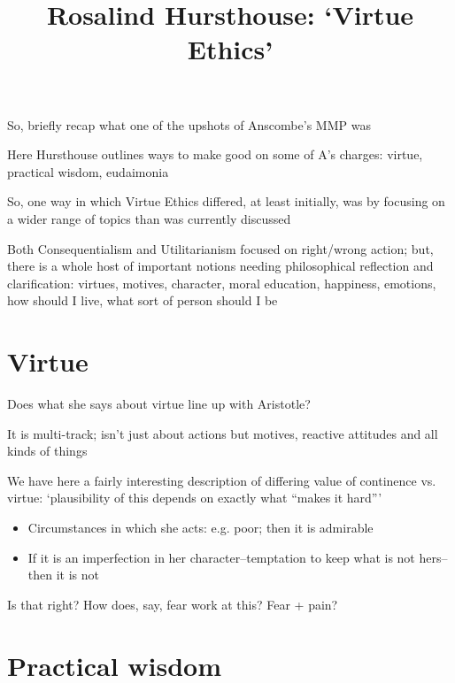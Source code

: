 \documentclass[11pt]{article}
\title{Rosalind Hursthouse: `Virtue Ethics'}
\author{}
\date{}
\begin{document}
\maketitle

\noindent So, briefly recap what one of the upshots of Anscombe's MMP was
\vspace*{2mm}

\noindent Here Hursthouse outlines ways to make good on some of A's charges: virtue, practical wisdom, eudaimonia
\vspace*{2mm}

\noindent So, one way in which Virtue Ethics differed, at least initially, was by focusing on a wider range of topics than was currently discussed
\vspace*{2mm}

\noindent Both Consequentialism and Utilitarianism focused on right/wrong action; but, there is a whole host of important notions needing philosophical reflection and clarification: virtues, motives, character, moral education, happiness, emotions, how should I live, what sort of person should I be
\vspace*{2mm}

\section{Virtue}

\noindent Does what she says about virtue line up with Aristotle?
\vspace*{2mm}

\noindent It is multi-track; isn't just about actions but motives, reactive attitudes and all kinds of things
\vspace*{2mm}

\noindent We have here a fairly interesting description of differing value of continence vs. virtue: `plausibility of this depends on exactly what ``makes it hard'''

\begin{itemize}\item{Circumstances in which she acts: e.g. poor; then it is admirable}\item{If it is an imperfection in her character--temptation to keep what is not hers--then it is not}\end{itemize}

\noindent Is that right? How does, say, fear work at this? Fear + pain?
\vspace*{2mm}

\section{Practical wisdom}
\end{document}
